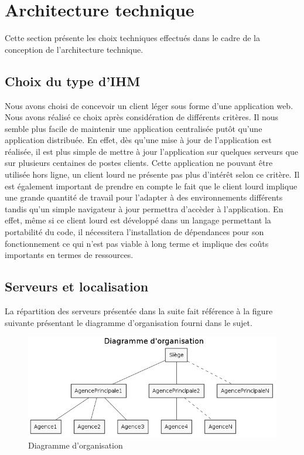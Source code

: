 \section{Architecture technique}

Cette section présente les choix techniques effectués dans le cadre de la conception de l'architecture technique.

\subsection{Choix du type d'IHM}

Nous avons choisi de concevoir un client léger sous forme d'une application web. Nous avons réalisé ce choix après considération de différents critères. Il nous semble plus facile de maintenir une application centralisée putôt qu'une application distribuée. En effet, dès qu'une mise à jour de l'application est réalisée, il est plus simple de mettre à jour l'application sur quelques serveurs que sur plusieurs centaines de postes clients. Cette application ne pouvant être utilisée hors ligne, un client lourd ne présente pas plus d'intérêt selon ce critère. Il est également important de prendre en compte le fait que le client lourd implique une grande quantité de travail pour l'adapter à des environnements différents tandis qu'un simple navigateur à jour permettra d'accèder à l'application. En effet, même si ce client lourd est développé dans un langage permettant la portabilité du code, il nécessitera l'installation de dépendances pour son fonctionnement ce qui n'est pas viable à long terme et implique des coûts importants en termes de ressources. 

\subsection{Serveurs et localisation}

La répartition des serveurs présentée dans la suite fait référence à la figure suivante présentant le diagramme d'organisation fourni dans le sujet.

\begin{figure}[H]
    \centering
	\includegraphics[scale=0.6]{figures/DO.png}
	\caption{Diagramme d'organisation}
\end{figure}


